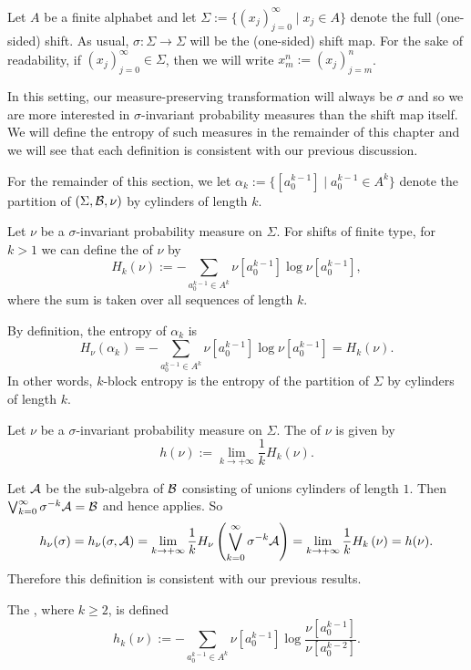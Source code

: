 Let $A$ be a finite alphabet and let $\Sigma := \{(x_j)_{j = 0}^\infty \mid x_j \in A\}$ denote the full (one-sided) shift. As usual, $\sigma : \Sigma \to \Sigma$ will be the (one-sided) shift map. For the sake of readability, if $(x_j)_{j = 0}^\infty \in \Sigma$, then we will write $x_m^n := (x_j)_{j = m}^n$.

In this setting, our measure-preserving transformation will always be $\sigma$ and so we are more interested in $\sigma$-invariant probability measures than the shift map itself. We will define the entropy of such measures in the remainder of this chapter and we will see that each definition is consistent with our previous discussion.

For the remainder of this section, we let $\alpha_k := \{[a_0^{k - 1}] \mid a_0^{k - 1} \in A^k\}$ denote the partition of $(\Sigma, \mathcal{B}, \nu)$ by cylinders of length $k$.

\begin{definition}
	Let $\nu$ be a $\sigma$-invariant probability measure on $\Sigma$. For shifts of finite type, for $k > 1$ we can define the  of $\nu$ by
	\[
		H_k(\nu) := -\sum_{a_0^{k - 1} \in A^k}{\nu[a_0^{k - 1}] \log\nu[a_0^{k - 1}]},
	\]
	where the sum is taken over all sequences of length $k$.
\end{definition}

By definition, the entropy of $\alpha_k$ is
\[
	H_\nu(\alpha_k) = -\sum_{a_0^{k - 1} \in A^k}{\nu[a_0^{k - 1}] \log\nu[a_0^{k - 1}]} = H_k(\nu).
\]
In other words, $k$-block entropy is the entropy of the partition of $\Sigma$ by cylinders of length $k$.

\begin{definition}
	Let $\nu$ be a $\sigma$-invariant probability measure on $\Sigma$. The  of $\nu$ is given by
	\[
		h(\nu) := \lim_{k \to +\infty}{\frac{1}{k} H_k(\nu)}.
	\]
\end{definition}

Let $\mathcal{A}$ be the sub-algebra of $\mathcal{B}$ consisting of unions cylinders of length $1$. Then $\bigvee_{k = 0}^\infty{\sigma^{-k}{\mathcal{A}}} = \mathcal{B}$ and hence  applies. So
\[
	h_\nu(\sigma) = h_\nu(\sigma, \mathcal{A}) = \lim_{k \to +\infty}{\frac{1}{k} H_\nu\left(\bigvee_{k = 0}^\infty{\sigma^{-k}{\mathcal{A}}}\right)} = \lim_{k \to +\infty}{\frac{1}{k} H_k\left(\nu\right)} = h(\nu).
\]
Therefore this definition is consistent with our previous results.

\begin{definition}
	The , where $k \geq 2$, is defined
	\[
		h_k(\nu) := -\sum_{a_0^{k - 1} \in A^k}{\nu[a_0^{k - 1}] \log{\frac{\nu[a_0^{k - 1}]}{\nu[a_0^{k - 2}]}}}.
	\]
\end{definition}

